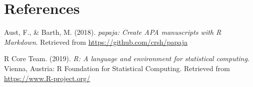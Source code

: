 \documentclass[man]{apa6}
\begin{document}
\newpage

\hypertarget{references}{%
\section{References}\label{references}}

\begingroup
\setlength{\parindent}{-0.5in}
\setlength{\leftskip}{0.5in}

\hypertarget{refs}{}
\leavevmode\hypertarget{ref-R-papaja}{}%
Aust, F., \& Barth, M. (2018). \emph{papaja: Create APA manuscripts with R Markdown}. Retrieved from \url{https://github.com/crsh/papaja}

\leavevmode\hypertarget{ref-R-base}{}%
R Core Team. (2019). \emph{R: A language and environment for statistical computing}. Vienna, Austria: R Foundation for Statistical Computing. Retrieved from \url{https://www.R-project.org/}

\endgroup
\end{document}
